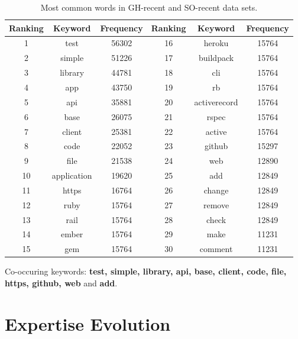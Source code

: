         
        \begin{table}
          \centering
          \caption{Most common words in GH-recent and SO-recent data sets.}\label{tab:RQ3_recent}
            \vspace{6pt} %
          \begin{tabular}{|c c c | c c c|}
            \hline
            Ranking & Keyword & Frequency & Ranking & Keyword & Frequency \\
            \hline\hline
            1 & test & 56302 & 16 & heroku & 15764 \\
            2 & simple & 51226 & 17 & buildpack & 15764 \\
            3 & library & 44781 & 18 & cli & 15764 \\
            4 & app & 43750 & 19 & rb & 15764 \\
            5 & api & 35881 & 20 & activerecord & 15764 \\
            6 & base & 26075 & 21 & rspec & 15764 \\
            7 & client & 25381 & 22 & active & 15764 \\
            8 & code & 22052 & 23 & github & 15297 \\
            9 & file & 21538 & 24 & web & 12890 \\
            10 & application & 19620 & 25 & add & 12849 \\
            11 & https & 16764 & 26 & change & 12849\\
            12 & ruby & 15764  & 27 & remove & 12849 \\
            13 & rail & 15764 & 28 & check & 12849\\
            14 & ember & 15764 & 29 & make & 11231 \\
            15 & gem & 15764 & 30 & comment & 11231\\
            \hline
          \end{tabular}
        \end{table}
        
        Co-occuring keywords: \textbf{test, simple, library, api, base, client, code, file, https, github, web} and \textbf{add}.
    
    \section{Expertise Evolution}
    
